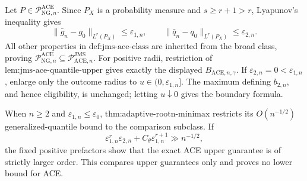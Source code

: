 Let \(P\in\mathcal P_{\mathrm{NG},n}^{\mathrm{ACE}}\).  Since \(P_X\) is a probability measure and \(s\ge r+1>r\), Lyapunov's inequality gives
\[
 \|\bar g_n-g_0\|_{L^r(P_X)}\le\varepsilon_{1,n},
 \qquad
 \|\bar q_n-q_0\|_{L^r(P_X)}\le\varepsilon_{2,n}.
\]
All other properties in \(\text{def:jms-ace-class}\) are inherited from the broad class, proving \(\mathcal P_{\mathrm{NG},n}^{\mathrm{ACE}}\subseteq\mathcal P_{\mathrm{ACE},n}^{\mathrm{JMS}}\).  For positive radii, restriction of \(\text{lem:jms-ace-quantile-upper}\) gives exactly the displayed \(B_{\mathrm{ACE},n,\gamma}\).  If \(\varepsilon_{2,n}=0<\varepsilon_{1,n}\), enlarge only the outcome radius to \(u\in(0,\varepsilon_{1,n}]\).  The maximum defining \(b_{2,n}\), and hence eligibility, is unchanged; letting \(u\downarrow0\) gives the boundary formula.

When \(n\ge2\) and \(\varepsilon_{1,n}\le\varepsilon_0\), \(\text{thm:adaptive-rootn-minimax}\) restricts its \(O(n^{-1/2})\) generalized-quantile bound to the comparison subclass.  If
\[
 \varepsilon_{1,n}^r\varepsilon_{2,n}+C_{\theta}\varepsilon_{1,n}^{r+1}\gg n^{-1/2},
\]
the fixed positive prefactors show that the exact ACE upper guarantee is of strictly larger order.  This compares upper guarantees only and proves no lower bound for ACE.